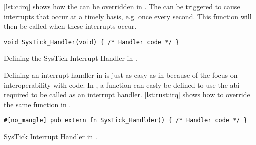 \autoref{lst:c:irq} shows how the  can be overridden in {\C}.
The {\gecko} can be triggered to cause interrupts that occur at a timely basis, e.g. once every second.
This function will then be called when these interrupts occur.

\begin{listing}[H]
  \begin{verbatim}
void SysTick_Handler(void) { /* Handler code */ }
  \end{verbatim}
  \caption{Defining the SysTick Interrupt Handler in {\C}.}
  \label{lst:c:irq}
\end{listing}

Defining an interrupt handler in {\rust} is just as easy as in {\C} because of the focus on interoperability with {\C} code.
In {\rust}, a function can easly be defined to use the {\C} \gls{abi} required to be called as an interrupt handler.
\autoref{lst:rust:irq} shows how to override the same  function in {\rust}.

\begin{listing}[H]
  \begin{verbatim}
#[no_mangle] pub extern fn SysTick_Handlder() { /* Handler code */ }
  \end{verbatim}
  \caption{SysTick Interrupt Handler in {\rust}.}
  \label{lst:rust:irq}
\end{listing}
